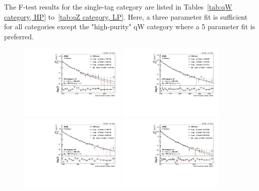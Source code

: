 The F-test results for the single-tag category are listed in Tables~\ref{tab:qW category, HP} to~\ref{tab:qZ category, LP}.
Here, a three parameter fit is sufficient for all categories except the "high-purity" qW category where a 5 parameter fit is preferred.


\begin{figure}[h!]
\centering
\includegraphics[width=0.45\textwidth]{figures/analysis/search2/AN-16-235/plots/WWHP.pdf}
\includegraphics[width=0.45\textwidth]{figures/analysis/search2/AN-16-235/plots/WWLP.pdf}\\
\includegraphics[width=0.45\textwidth]{figures/analysis/search2/AN-16-235/plots/WZHP.pdf}
\includegraphics[width=0.45\textwidth]{figures/analysis/search2/AN-16-235/plots/WZLP.pdf}\\

\end{figure}
